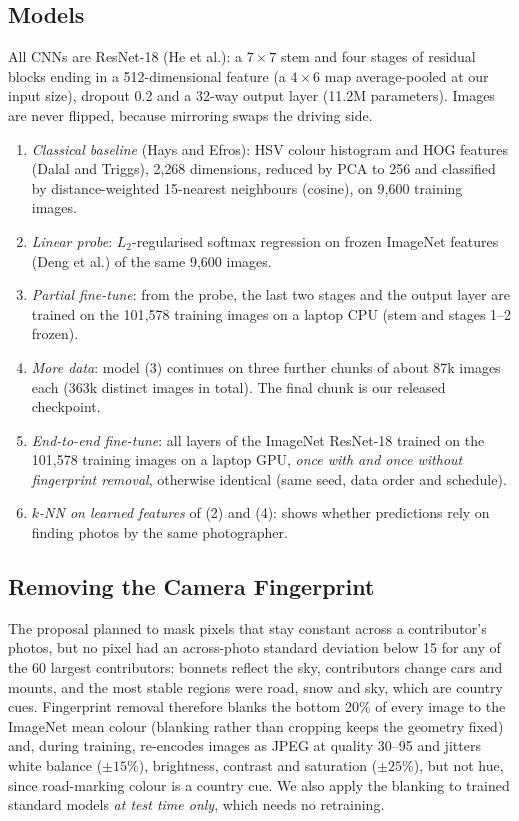 \documentclass[clean,twocolumn]{bam-project}
\begin{document}
\subsection{Models}
All CNNs are ResNet-18 (He et al.): a $7\times7$ stem and four stages of residual blocks ending in a
512-dimensional feature (a $4\times6$ map average-pooled at our input size), dropout 0.2 and a 32-way
output layer (11.2M parameters). Images are never flipped, because mirroring swaps the driving side.
\begin{enumerate}[label=(\arabic*),leftmargin=*]
\item \emph{Classical baseline} (Hays and Efros): HSV colour histogram and HOG features (Dalal and
Triggs), 2{,}268 dimensions, reduced by PCA to 256 and classified by distance-weighted 15-nearest
neighbours (cosine), on 9{,}600 training images.
\item \emph{Linear probe}: $L_2$-regularised softmax regression on frozen ImageNet features (Deng et
al.) of the same 9{,}600 images.
\item \emph{Partial fine-tune}: from the probe, the last two stages and the output layer are trained on
the 101{,}578 training images on a laptop CPU (stem and stages 1--2 frozen).
\item \emph{More data}: model (3) continues on three further chunks of about 87k images each (363k
distinct images in total). The final chunk is our released checkpoint.
\item \emph{End-to-end fine-tune}: all layers of the ImageNet ResNet-18 trained on the 101{,}578
training images on a laptop GPU, \emph{once with and once without fingerprint removal}, otherwise
identical (same seed, data order and schedule).
\item \emph{$k$-NN on learned features} of (2) and (4): shows whether predictions rely on finding
photos by the same photographer.
\end{enumerate}

\subsection{Removing the Camera Fingerprint}
The proposal planned to mask pixels that stay constant across a contributor's photos, but no pixel had
an across-photo standard deviation below 15 for any of the 60 largest contributors: bonnets reflect the
sky, contributors change cars and mounts, and the most stable regions were road, snow and sky, which are
country cues. Fingerprint removal therefore blanks the bottom 20\% of every image to the ImageNet mean
colour (blanking rather than cropping keeps the geometry fixed) and, during training, re-encodes images
as JPEG at quality 30--95 and jitters white balance ($\pm15\%$), brightness, contrast and saturation
($\pm25\%$), but not hue, since road-marking colour is a country cue. We also apply the blanking to
trained standard models \emph{at test time only}, which needs no retraining.
\end{document}
